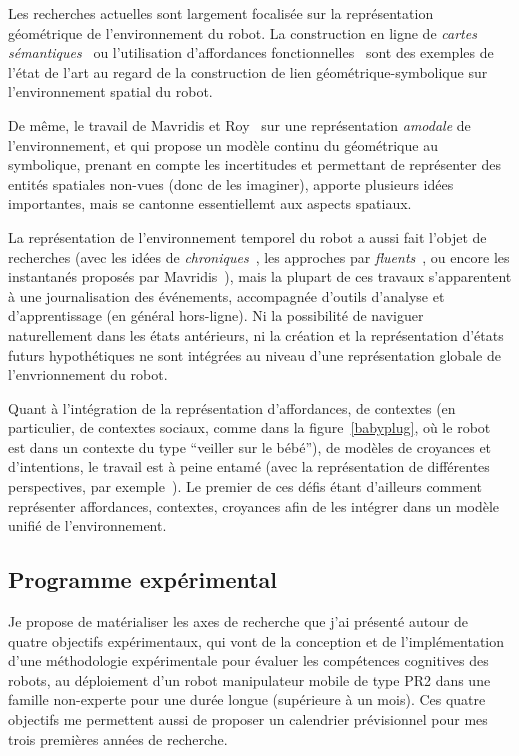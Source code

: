 \documentclass[a4paper]{article}
\begin{document}
Les recherches actuelles sont largement focalisée sur la représentation
géométrique de l'environnement du robot. La construction en ligne de
\emph{cartes sémantiques}~\cite{Nuechter2008, Galindo2008,
Blodow2011} ou l'utilisation d'affordances fonctionnelles~\cite{Varadarajan2011}
sont des exemples de l'état de l'art au regard de la construction de lien
géométrique-symbolique sur l'environnement spatial du robot.

De même, le travail de Mavridis et Roy~\cite{Mavridis2006} sur une représentation
\emph{amodale} de l'environnement, et qui propose un modèle continu du géométrique
au symbolique, prenant en compte les incertitudes et permettant de représenter
des entités spatiales non-vues (donc de les imaginer), apporte plusieurs idées
importantes, mais se cantonne essentiellemt aux aspects spatiaux.

La représentation de l'environnement temporel du robot a aussi fait l'objet de
recherches (avec les idées de \emph{chroniques}~\cite{Ghallab1996}, les
approches par \emph{fluents}~\cite{mosenlechner2010becoming}, ou encore les
instantanés proposés par Mavridis~\cite{Mavridis2006}), mais la plupart de ces
travaux s'apparentent à une journalisation des événements, accompagnée d'outils
d'analyse et d'apprentissage (en général hors-ligne). Ni la possibilité de
naviguer naturellement dans les états antérieurs, ni la création et la
représentation d'états futurs hypothétiques ne sont intégrées au niveau d'une
représentation globale de l'envrionnement du robot.

Quant à l'intégration de la représentation d'affordances, de contextes (en
particulier, de contextes sociaux, comme dans la figure~\ref{babyplug}, où le
robot est dans un contexte du type ``veiller sur le bébé''), de modèles de
croyances et d'intentions, le travail est à peine entamé (avec la représentation
de différentes perspectives, par exemple~\cite{ros2010which}). Le premier de ces
défis étant d'ailleurs comment représenter affordances, contextes, croyances
afin de les intégrer dans un modèle unifié de l'environnement.


\subsection{Programme expérimental}

Je propose de matérialiser les axes de recherche que j'ai présenté autour de
quatre objectifs expérimentaux, qui vont de la conception et de
l'implémentation d'une méthodologie expérimentale pour évaluer les compétences
cognitives des robots, au déploiement d'un robot manipulateur mobile de type
PR2 dans une famille non-experte pour une durée longue (supérieure à un mois).
Ces quatre objectifs me permettent aussi de proposer un calendrier prévisionnel
pour mes trois premières années de recherche.
\end{document}

